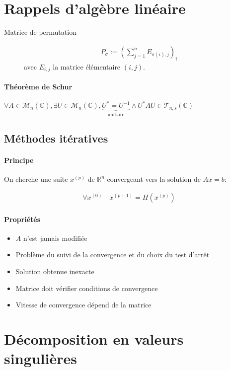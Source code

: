 \documentclass{article}
\newcommand{\cM}{\mathcal{M}}
\newcommand{\cT}{\mathcal{T}}
\newcommand{\R}{\mathbb{R}}
\newcommand{\C}{\mathbb{C}}
\newenvironment{theorem}[1][\unskip]{
	\paragraph{Théorème #1}

}{}
\begin{document}
\section{Rappels d'algèbre linéaire}

\begin{description}
	\item[Matrice de permutation] \begin{align*}
		P_\sigma := \left(\sum_{j=1}^{n} E_{\sigma(i),j}\right)_i
	\end{align*} avec $E_{i, j}$ la matrice élémentaire $(i, j)$.
\end{description}

\begin{theorem}[de Schur]
	$\forall  A \in \cM_n(\C), \exists U \in \cM_n(\C), \underbrace{U^\ast = U^{-1}}_{\text{unitaire}} \land U^\ast AU \in \cT_{n, s}(\C)$
\end{theorem}

\subsection{Méthodes itératives}

\paragraph{Principe}

On cherche une suite $x^{(p)}$ de $\R^{n}$ convergeant vers la solution de $Ax = b$:

\begin{align*}
	\forall x^{(0)}\quad x^{(p+1)} = H(x^{(p)})
\end{align*}

\paragraph{Propriétés}

\begin{itemize}
	\item $A$ n'est jamais modifiée
	\item Problème du suivi de la convergence et du choix du test d'arrêt
	\item Solution obtenue inexacte
	\item Matrice doit vérifier conditions de convergence
	\item Vitesse de convergence dépend de la matrice
\end{itemize}

\section{Décomposition en valeurs singulières}
\end{document}
